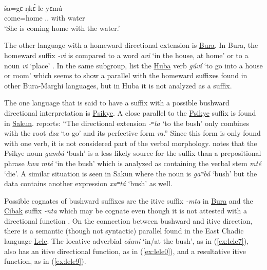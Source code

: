 \ea\label{ex:psik14}
 \\
\gll ša=gɛ ŋkɛ́ le yɛmú \\
come=home .. with water	\\
\glt `She is coming home with the water.'
\z 

The other language with a homeward directional extension is \hyperref[bura]{Bura}. In Bura, the homeward suffix \textit{-vi} is compared to a word \textit{avi} `in the house, at home' \citep[301]{hoffmannUntersuchungenZurStruktur1955} or to a noun \textit{vi} `place' \citep[7]{blenchBuraVerbalExtensions2010}. In the same subgroup, \citet[24]{muazuModernKilbaDictionary2015} list the \hyperref[huba]{Huba} verb \textit{gúví} `to go into a house or room' which seems to show a parallel with the homeward suffixes found in other Bura-Marghi languages, but in Huba it is not analyzed as a suffix. 

The one language that is said to have a suffix with a possible bushward directional interpretation is \hyperref[psik]{Psikye}. A close parallel to the \hyperref[psik]{Psikye} suffix is found in \hyperref[saku]{Sakun}. \citet[122]{thomasGrammarSakunSukur2014} reports: ``The directional extension \textit{-ᵐta} `to the bush' only combines with the root \textit{dza} ‘to go’ and its perfective form \textit{ra}.'' Since this form is only found with one verb, it is not considered part of the verbal morphology. \citet[163]{smithKapsikiLanguage1969} notes that the Psikye noun \textit{gambá} `bush' is a less likely source for the suffix than a prepositional phrase \textit{kwa mté} `in the bush' which is analyzed as containing the verbal stem \textit{mté} `die'. A similar situation is seen in Sakun where the noun is \textit{gaᵐbá} `bush' but the data contains another expression \textit{xaᵐtá} `bush' as well. 

Possible cognates of bushward suffixes are the itive suffix \textit{-mta} in \hyperref[bura]{Bura} \citep{hoffmannUntersuchungenZurStruktur1955,blenchBuraVerbalExtensions2010} and the \hyperref[ciba]{Cibak} suffix \textit{-nta} which may be cognate even though it is not attested with a directional function \citep[134]{hoffmannZurSpracheCibak1955}. On the connection between bushward and itive direction, there is a semantic (though not syntactic) parallel found in the East Chadic language \hyperref[lele]{Lele}. The locative adverbial \textit{cáaní} ‘in/at the bush’, as in (\ref{ex:lele7}), also has an itive directional function, as in (\ref{ex:lele0}), and a resultative itive function, as in (\ref{ex:lele9}).

